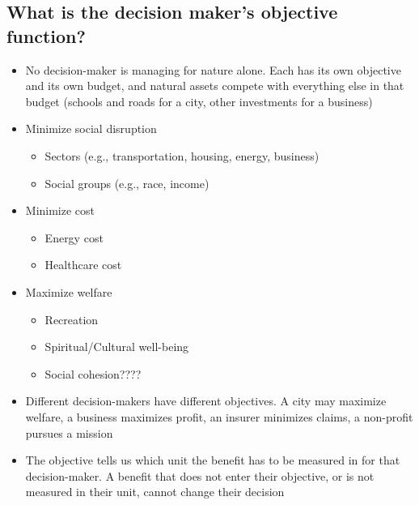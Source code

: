\documentclass[12pt]{article}
\begin{document}
\subsection{What is the decision maker's objective function?}
\begin{itemize}
  \item No decision-maker is managing for nature alone. Each has its own objective and its own budget, and natural assets compete with everything else in that budget (schools and roads for a city, other investments for a business)
  \item Minimize social disruption 
  \begin{itemize}
    \item Sectors (e.g., transportation, housing, energy, business)
    \item Social groups (e.g., race, income)
  \end{itemize}
  \item Minimize cost
  \begin{itemize}
    \item Energy cost
    \item Healthcare cost
  \end{itemize}
  \item Maximize welfare
  \begin{itemize}
    \item Recreation
    \item Spiritual/Cultural well-being
    \item Social cohesion????
  \end{itemize}
  \item Different decision-makers have different objectives. A city may maximize welfare, a business maximizes profit, an insurer minimizes claims, a non-profit pursues a mission
  \item The objective tells us which unit the benefit has to be measured in for that decision-maker. A benefit that does not enter their objective, or is not measured in their unit, cannot change their decision
\end{itemize}
  
\end{document}
